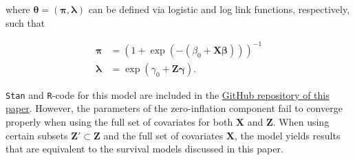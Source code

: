 where $\bm\theta = (\bm\pi, \bm\lambda)$ can be defined via logistic and log link functions, respectively, such that 

\begin{align*}
    \bm\pi &= (1 + \exp(-(\beta_0 + \bm{X} \bm\beta)))^{-1} \\
    \bm\lambda &= \exp(\gamma_0 + \bm{Z} \bm\gamma). 
\end{align*}

\texttt{Stan} and \texttt{R}-code for this model are included in the \href{https://github.com/pitrieger/BayesianStats_FinalProject}{GitHub repository of this paper}. However, the parameters of the zero-inflation component fail to converge properly when using the full set of covariates for both $\bm{X}$ and $\bm{Z}$. When using certain subsets $\bm{Z}' \subset \bm{Z}$ and the full set of covariates $\bm{X}$, the model yields results that are equivalent to the survival models discussed in this paper. 
